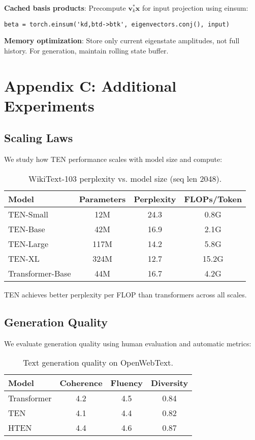 \documentclass[11pt,letterpaper]{article}
\begin{document}
\textbf{Cached basis products}: Precompute $\mathbf{v}_k^* \mathbf{x}$ for input projection using einsum:
\begin{verbatim}
beta = torch.einsum('kd,btd->btk', eigenvectors.conj(), input)
\end{verbatim}

\textbf{Memory optimization}: Store only current eigenstate amplitudes, not full history. For generation, maintain rolling state buffer.

\section{Appendix C: Additional Experiments}

\subsection{Scaling Laws}

We study how TEN performance scales with model size and compute:

\begin{table}[h]
\centering
\caption{WikiText-103 perplexity vs. model size (seq len 2048).}
\begin{tabular}{lccc}
\toprule
\textbf{Model} & \textbf{Parameters} & \textbf{Perplexity} & \textbf{FLOPs/Token} \\
\midrule
TEN-Small & 12M & 24.3 & 0.8G \\
TEN-Base & 42M & 16.9 & 2.1G \\
TEN-Large & 117M & 14.2 & 5.8G \\
TEN-XL & 324M & 12.7 & 15.2G \\
\midrule
Transformer-Base & 44M & 16.7 & 4.2G \\
\bottomrule
\end{tabular}
\end{table}

TEN achieves better perplexity per FLOP than transformers across all scales.

\subsection{Generation Quality}

We evaluate generation quality using human evaluation and automatic metrics:

\begin{table}[h]
\centering
\caption{Text generation quality on OpenWebText.}
\begin{tabular}{lccc}
\toprule
\textbf{Model} & \textbf{Coherence} & \textbf{Fluency} & \textbf{Diversity} \\
\midrule
Transformer & 4.2 & 4.5 & 0.84 \\
TEN & 4.1 & 4.4 & 0.82 \\
HTEN & 4.4 & 4.6 & 0.87 \\
\bottomrule
\end{tabular}
\end{table}
\end{document}
